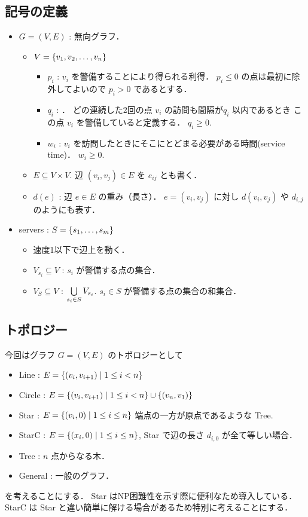 \subsection{記号の定義}
\begin{itemize}
\item $G = (V,E)$ : 無向グラフ．
\begin{itemize}
	\item $V = \left\{{ v_1, v_2, \ldots, v_n }\right\}$
	\begin{itemize}
		\item $p_i$ : $v_i$ を警備することにより得られる利得．
		$p_i \leq 0$ の点は最初に除外してよいので $p_i > 0$ であるとする．
		\item $q_i$ : \shuki ．
		どの連続した2回の点 $v_i$ の訪問も間隔が\shuki $q_i$ 以内であるとき
		この点 $v_i$ を警備していると定義する．
		$q_i \geq 0$.
		\item $w_i$ : $v_i$ を訪問したときにそこにとどまる必要がある時間(service time)．
		$w_i \geq 0$.
	\end{itemize}
	\item $E \subseteq V \times V$. 辺 $(v_i, v_j) \in E$ を $e_{ij}$ とも書く．
	\item $d(e)$ : 辺 $e \in E$ の重み（長さ）．
	$e = (v_i, v_j)$ に対し $d(v_i,v_j)$ や $d_{i,j}$ のようにも表す．
\end{itemize}


\item servers : $S = \left\{{ s_1, \ldots, s_m }\right\}$
\begin{itemize}
	\item 速度1以下で辺上を動く．
	\item $V_{s_i} \subseteq V$ : \server $s_i$ が警備する点の集合．
	\item $V_S     \subseteq V$ : $\bigcup\limits_{s_i \in S} V_{s_i}$. 
	\server $s_i \in S$ が警備する点の集合の和集合．
\end{itemize}
\end{itemize}



\subsection{トポロジー}
今回はグラフ $G = (V,E)$ のトポロジーとして
\begin{itemize}
	\item Line    : $E = \left\{{ (v_i, v_{i + 1}) }\;\middle|\;{ 1 \leq i < n }\right\}$
	\item Circle  : $E = \left\{{ (v_i, v_{i + 1}) }\;\middle|\;{ 1 \leq i < n }\right\} \cup \left\{{(v_n, v_1)}\right\}$
	\item Star    : $E = \left\{{ (v_i, 0) }\;\middle|\;{ 1 \leq i \leq n }\right\}$
	 端点の一方が原点であるような Tree.
	\item StarC   : $E = \left\{{ (x_i, 0) }\;\middle|\;{ 1 \leq i \leq n }\right\}$, 
	Star で辺の長さ $d_{i,0}$ が全て等しい場合．
	\item Tree    : $n$ 点からなる木．
	\item General : 一般のグラフ．
\end{itemize}
を考えることにする．
Star はNP困難性を示す際に便利なため導入している．
StarC は Star と違い簡単に解ける場合があるため特別に考えることにする．



